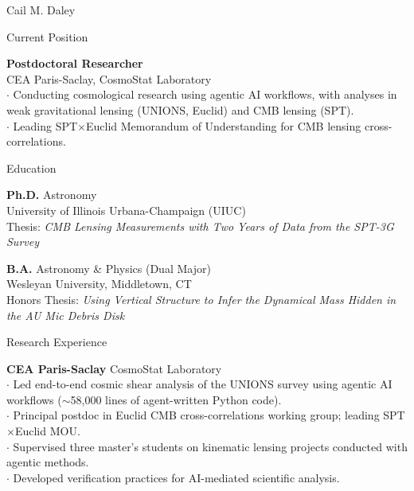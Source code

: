 \documentclass[11pt,a4paper]{article}
\begin{document}
\begin{cv}{Cail M. Daley}
  \setlength{\cvlabelsep}{1em}
  \settowidth{\cvlabelwidth}{\cvlabelfont 2024--Present}%
  \begin{cvlist}{{Current Position}}
  \item [2024--Present]
    \textbf{Postdoctoral Researcher} \\
    CEA Paris-Saclay, CosmoStat Laboratory \\
    $\cdot$ Conducting cosmological research using agentic AI workflows, with analyses in weak gravitational lensing (UNIONS, Euclid) and CMB lensing (SPT). \\
    $\cdot$ Leading SPT$\times$Euclid Memorandum of Understanding for CMB lensing cross-correlations.
  \end{cvlist}

  \begin{cvlist}{{Education}}
  \item[2018--2024]
    \textbf{Ph.D.  \textbar{}} Astronomy \\
    University of Illinois Urbana-Champaign (UIUC) \\
    Thesis: \textit{CMB Lensing Measurements with Two Years of Data from the SPT-3G Survey}

  \item[2014--2018]
    \textbf{B.A.} \textbar{} Astronomy \& Physics (Dual Major) \\
    {Wesleyan University}, Middletown, CT \\
    Honors Thesis: \textit{Using Vertical Structure to Infer the Dynamical Mass Hidden in the AU Mic Debris Disk}
  \end{cvlist}

  \begin{cvlist}{Research Experience}
  \item[2024--Present]
    \textbf{CEA Paris-Saclay} \textbar{} CosmoStat Laboratory \\
    $\cdot$ Led end-to-end cosmic shear analysis of the UNIONS survey using agentic AI workflows ($\sim$58,000 lines of agent-written Python code). \\
    $\cdot$ Principal postdoc in Euclid CMB cross-correlations working group; leading SPT$\times$Euclid MOU. \\
    $\cdot$ Supervised three master's students on kinematic lensing projects conducted with agentic methods. \\
    $\cdot$ Developed verification practices for AI-mediated scientific analysis.


\end{cvlist}
\end{cv}
\end{document}
